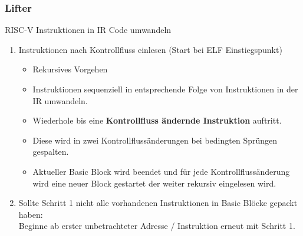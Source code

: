 
\begin{frame}
    \frametitle{Lifter}{RISC-V Instruktionen in IR Code umwandeln}

    \begin{enumerate}
        \setlength\itemsep{0.5em}
        \item Instruktionen nach Kontrollfluss einlesen (Start bei ELF Einstiegspunkt)
        \begin{itemize}
            \setlength\itemsep{0.5em}
            \item Rekursives Vorgehen
            \item Instruktionen sequenziell in entsprechende Folge von Instruktionen in der IR umwandeln.
            \item Wiederhole bis eine \textbf{Kontrollfluss ändernde Instruktion} auftritt.
            \item Diese wird in zwei Kontrollflussänderungen bei bedingten Sprüngen gespalten.
            \item Aktueller Basic Block wird beendet und für jede Kontrollflussänderung wird eine neuer Block gestartet der weiter rekursiv eingelesen wird. 
        \end{itemize}
        \item Sollte Schritt 1 nicht alle vorhandenen Instruktionen in Basic Blöcke gepackt haben:\\ Beginne ab erster unbetrachteter Adresse / Instruktion erneut mit Schritt 1.
    \end{enumerate}
\end{frame}
\clearpage

